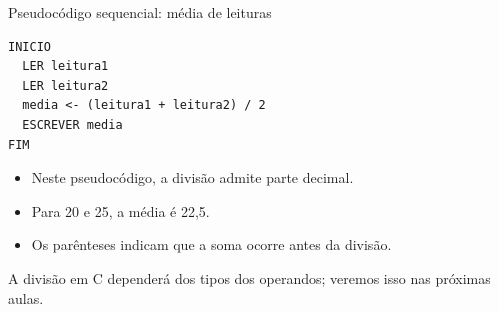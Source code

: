 \begin{frame}[fragile,t]{Pseudocódigo sequencial: média de leituras}
\begin{lstlisting}[language={}]
INICIO
  LER leitura1
  LER leitura2
  media <- (leitura1 + leitura2) / 2
  ESCREVER media
FIM
\end{lstlisting}
\begin{itemize}
\item Neste pseudocódigo, a divisão admite parte decimal.
\item Para 20 e 25, a média é 22,5.
\item Os parênteses indicam que a soma ocorre antes da divisão.
\end{itemize}
\small A divisão em C dependerá dos tipos dos operandos; veremos isso nas próximas aulas.
\end{frame}
